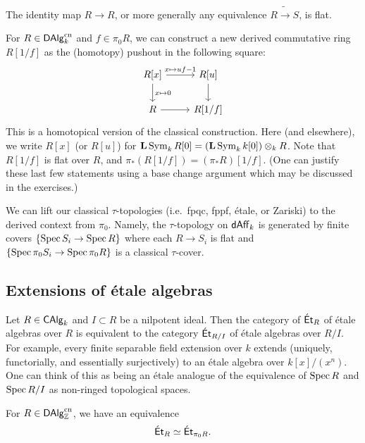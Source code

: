 \documentclass{amsart}
\begin{document}
\begin{ex}
	The identity map $R \to R$, or more generally any equivalence $R \tilde{\to} S$, is flat.
\end{ex}

\begin{ex}
	For $R \in \mathsf{DAlg}_k^{\mathrm{cn}}$ and $f \in \pi_0 R$, we can construct a new derived commutative ring $R[1/f]$ as the (homotopy) pushout in the following square:
\[
\begin{tikzcd}
{R[x]} \rar["x \mapsto u f - 1"] \dar["x \mapsto 0"] & {R[u]} \dar \\
R \rar & {R[1/f]}
\end{tikzcd}
\]
	This is a homotopical version of the classical construction.
	Here (and elsewhere), we write $R[x]$ (or $R[u]$) for $\mathbf{L} \operatorname{Sym}_k R[0] = (\mathbf{L} \operatorname{Sym}_k k[0]) \otimes_k R$.
	Note that $R[1/f]$ is flat over $R$, and $\pi_*(R[1/f]) = (\pi_* R)[1/f]$.
	(One can justify these last few statements using a base change argument which may be discussed in the exercises.)
\end{ex}

We can lift our classical $\tau$-topologies (i.e.\ fpqc, fppf, \'etale, or Zariski) to the derived context from $\pi_0$.
Namely, the $\tau$-topology on $\mathsf{dAff}_k$ is generated by finite covers $\{ \operatorname{Spec} S_i \to \operatorname{Spec} R \}$ where each $R \to S_i$ is flat and $\{ \operatorname{Spec} \pi_0 S_i \to \operatorname{Spec} \pi_0 R \}$ is a classical $\tau$-cover.

\subsection{Extensions of \'etale algebras}

Let $R \in \mathsf{CAlg}_k$ and $I \subset R$ be a nilpotent ideal.
Then the category of $\mathsf{\acute{E}t}_R$ of \'etale algebras over $R$ is equivalent to the category $\mathsf{\acute{E}t}_{R/I}$ of \'etale algebras over $R/I$.
For example, every finite separable field extension over $k$ extends (uniquely, functorially, and essentially surjectively) to an \'etale algebra over $k[x]/(x^n)$.
One can think of this as being an \'etale analogue of the equivalence of $\operatorname{Spec} R$ and $\operatorname{Spec} R/I$ as non-ringed topological spaces.

\begin{thm}[Lurie]
For $R \in \mathsf{DAlg}_{\mathbb{Z}}^{\mathrm{cn}}$, we have an equivalence
	\[
		\mathsf{\acute{E}t}_R \simeq \mathsf{\acute{E}t}_{\pi_0 R}.
	\]
\end{thm}
\end{document}
